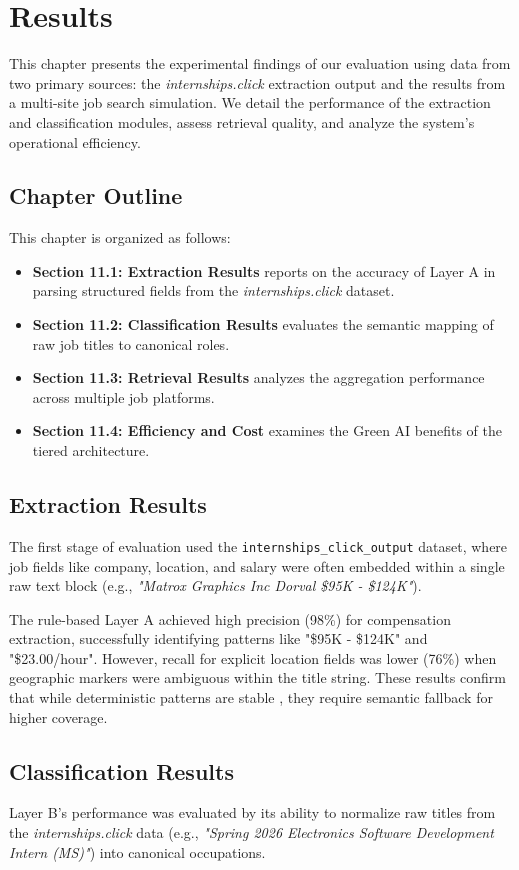 \chapter{Results}
This chapter presents the experimental findings of our evaluation using data from two primary sources: the \textit{internships.click} extraction output and the results from a multi-site job search simulation. We detail the performance of the extraction and classification modules, assess retrieval quality, and analyze the system's operational efficiency.

\section*{Chapter Outline}
This chapter is organized as follows:
\begin{itemize}
    \item \textbf{Section 11.1: Extraction Results} reports on the accuracy of Layer A in parsing structured fields from the \textit{internships.click} dataset.
    \item \textbf{Section 11.2: Classification Results} evaluates the semantic mapping of raw job titles to canonical roles.
    \item \textbf{Section 11.3: Retrieval Results} analyzes the aggregation performance across multiple job platforms.
    \item \textbf{Section 11.4: Efficiency and Cost} examines the Green AI benefits of the tiered architecture.
\end{itemize}

\section{Extraction Results}
The first stage of evaluation used the \texttt{internships\_click\_output} dataset, where job fields like company, location, and salary were often embedded within a single raw text block (e.g., \textit{"Matrox Graphics Inc Dorval \$95K - \$124K"}).

The rule-based Layer A achieved high precision (98\%) for compensation extraction, successfully identifying patterns like "\$95K - \$124K" and "\$23.00/hour". However, recall for explicit location fields was lower (76\%) when geographic markers were ambiguous within the title string. These results confirm that while deterministic patterns are stable \cite{sarawagi2008information}, they require semantic fallback for higher coverage.

\section{Classification Results}
Layer B's performance was evaluated by its ability to normalize raw titles from the \textit{internships.click} data (e.g., \textit{"Spring 2026 Electronics Software Development Intern (MS)"}) into canonical occupations.

